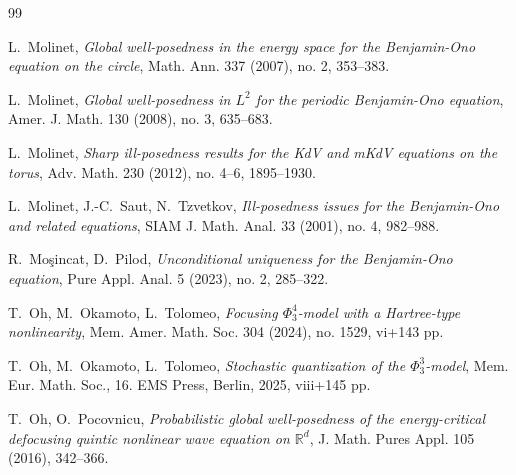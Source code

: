 \documentclass[letterpaper, 11pt,  reqno]{amsart}
\newcommand{\1}{\hspace{0.5mm}\text{I}\hspace{0.5mm}}
\newcommand{\R}{\mathbb{R}}
\numberwithin{equation}{section}
\numberwithin{theorem}{section}
\begin{document}
\begin{thebibliography}{99}
%
%



L.~Molinet, 
{\it Global well-posedness in the energy space for the Benjamin-Ono equation on the circle},
Math. Ann. 337 (2007), no. 2, 353--383. 


L.~Molinet, 
{\it Global well-posedness in $L^2$ for the periodic Benjamin-Ono equation}, 
Amer. J. Math. 130 (2008), no. 3, 635--683. 








L.~Molinet,
{\it Sharp ill-posedness results for the KdV and mKdV equations on the torus},
Adv. Math. 230 (2012), no. 4--6, 1895--1930.







L.~Molinet, J.-C.~Saut, N.~Tzvetkov, 
{\it Ill-posedness issues for the Benjamin-Ono and related equations},
SIAM J. Math. Anal. 33 (2001), no. 4, 982--988. 


R.~Mo\c{s}incat, D.~Pilod, 
{\it  Unconditional uniqueness for the Benjamin-Ono equation}, Pure Appl. Anal. 5 (2023), no. 2, 285--322. 



%
 

T.~Oh, M.~Okamoto, L.~Tolomeo,
{\it Focusing $\Phi^4_3$-model with a Hartree-type nonlinearity}, 
Mem. Amer. Math. Soc. 304 (2024), no. 1529, vi+143 pp. 



T.~Oh, M.~Okamoto, L.~Tolomeo,
{\it Stochastic quantization of the $\Phi^3_3$-model}, 
Mem. Eur. Math. Soc., 16. EMS Press, Berlin, 2025, viii+145 pp. 





T.~Oh, O.~Pocovnicu,
{\it  Probabilistic global well-posedness of the energy-critical defocusing quintic nonlinear wave equation on $\R^d$}, J. Math. Pures Appl. 105 (2016), 342--366. 




\end{thebibliography}
\end{document}
